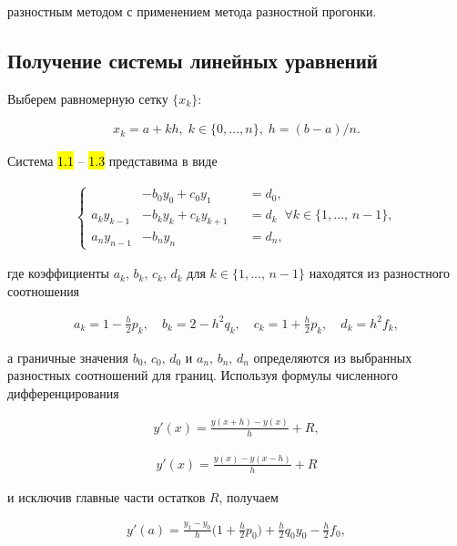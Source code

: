 разностным методом с применением метода разностной прогонки.

\subsection{Получение системы линейных уравнений}

Выберем равномерную сетку $ \{x_k\} $:

\hs
\begin{gather}
x_k = a + kh, \; k \in \{0, \dots, n\}, \; h = (b-a)/n.
\end{gather}

Система \hl{1.1} -- \hl{1.3} представима в виде

\hs
\begin{gather}
    \left\{
    \begin{aligned}
        & -b_0 y_0 + c_0 y_1 && = d_0, \\
        a_k y_{k-1} & -b_k y_k +c_k y_{k+1} && = d_k \;\; \forall k \in \{1,...,\,n-1\}, \\
        a_n y_{n-1} & -b_n y_n && = d_n,
    \end{aligned}
    \right.
\end{gather}

где коэффициенты $ a_k, \, b_k, \, c_k, \, d_k $ для $ k\in\{1,...,\,n-1\} $ находятся из разностного соотношения

\hs
\begin{gather}
    a_k = 1 - \frac{h}{2} p_k, \quad b_k = 2 - h^2 q_k, \quad c_k = 1 + \frac{h}{2} p_k, \quad d_k = h^2 f_k,
\end{gather}

а граничные значения $ b_0, \, c_0, \, d_0 $ и $ a_n, \, b_n, \, d_n $ определяются из выбранных разностных соотношений для границ. Используя формулы численного дифференцирования

\hs
\begin{gather}
    y'(x) = \frac{y(x+h)-y(x)}{h} + R,
\end{gather}

\begin{gather}
    y'(x) = \frac{y(x)-y(x-h)}{h} + R
\end{gather}

и исключив главные части остатков $ R $, получаем

\hs
\begin{gather}
    y'(a) = \frac{y_1 - y_0}{h} \Big(1 + \frac{h}{2} p_0 \Big) + \frac{h}{2} q_0 y_0 - \frac{h}{2} f_0,
\end{gather}

